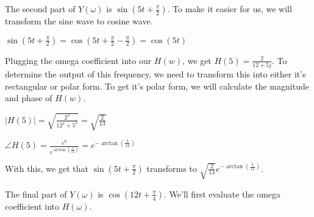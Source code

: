 \documentclass[12pt,letterpaper, onecolumn]{exam}
\begin{document}
\begin{enumerate}
        The second part of \begin{math}Y(\omega)\end{math} is \begin{math}\sin{(5t + \frac{\pi}{2})}\end{math}. To make it easier for us, we will transform the sine wave to cosine wave. 

        \begin{center}\begin{math}
            \sin{(5t + \frac{\pi}{2})} = \cos{(5t + \frac{\pi}{2} - \frac{\pi}{2})} = \cos{(5t)}
        \end{math}\end{center}

        Plugging the omega coefficient into our \begin{math}
            H(w)
        \end{math}, we get \begin{math}
            H(5)= \frac{2}{12 + 5j}
        \end{math}. To determine the output of this frequency, we need to transform this into either it's rectangular or polar form. To get it's polar form, we will calculate the magnitude and phase of \begin{math}
            H(w)
        \end{math}.

        \begin{center}\begin{math}
            |H(5)| = \sqrt{\frac{2^2}{12^2 + 5^2}} = \sqrt{\frac{2}{13}}
        \end{math}\end{center}
        \begin{center}\begin{math}
            \angle H(5) = \frac{e^0}{e^{\arctan{(\frac{5}{12})}}} = e^{-\arctan          {(\frac{5}{12})}}
        \end{math}\end{center}

        With this, we get that \begin{math}\sin{(5t + \frac{\pi}{2})}\end{math} transforms to \begin{math}\sqrt{\frac{2}{13}}e^{-\arctan{(\frac{5}{12})}}\end{math}.

        The final part of \begin{math}Y(\omega)\end{math} is \begin{math}\cos{(12t + \frac{\pi}{4})}\end{math}. We'll first evaluate the omega coefficient into \begin{math}H(\omega)\end{math}.


\end{enumerate}
\end{document}
